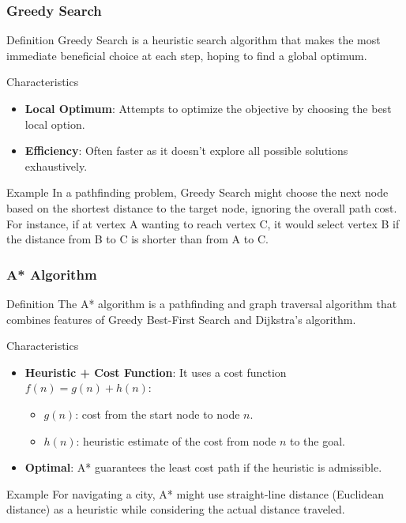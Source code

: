 \documentclass[aspectratio=169]{beamer}
\begin{document}
\begin{frame}[fragile]
    \frametitle{Greedy Search}
    \begin{block}{Definition}
        Greedy Search is a heuristic search algorithm that makes the most immediate beneficial choice at each step, hoping to find a global optimum.
    \end{block}
    \begin{block}{Characteristics}
        \begin{itemize}
            \item \textbf{Local Optimum}: Attempts to optimize the objective by choosing the best local option.
            \item \textbf{Efficiency}: Often faster as it doesn't explore all possible solutions exhaustively.
        \end{itemize}
    \end{block}
    \begin{block}{Example}
        In a pathfinding problem, Greedy Search might choose the next node based on the shortest distance to the target node, ignoring the overall path cost. For instance, if at vertex A wanting to reach vertex C, it would select vertex B if the distance from B to C is shorter than from A to C.
    \end{block}
\end{frame}

\begin{frame}[fragile]
    \frametitle{A* Algorithm}
    \begin{block}{Definition}
        The A* algorithm is a pathfinding and graph traversal algorithm that combines features of Greedy Best-First Search and Dijkstra's algorithm.
    \end{block}
    \begin{block}{Characteristics}
        \begin{itemize}
            \item \textbf{Heuristic + Cost Function}: It uses a cost function \( f(n) = g(n) + h(n) \):
            \begin{itemize}
                \item \( g(n) \): cost from the start node to node \( n \).
                \item \( h(n) \): heuristic estimate of the cost from node \( n \) to the goal.
            \end{itemize}
            \item \textbf{Optimal}: A* guarantees the least cost path if the heuristic is admissible.
        \end{itemize}
    \end{block}
    \begin{block}{Example}
        For navigating a city, A* might use straight-line distance (Euclidean distance) as a heuristic while considering the actual distance traveled.
    \end{block}
\end{frame}
\end{document}
